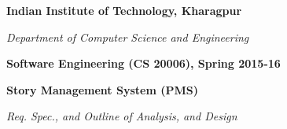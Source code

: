 \documentclass{article}
\begin{document}
\thispagestyle{plain}
\setcounter{page}{1}

\begin{center}
{\huge {\bf Indian Institute of Technology, Kharagpur}} 

{\LARGE {\em Department of Computer Science and Engineering}}
\vspace{0.4cm}

{\Large \bf Software Engineering (CS 20006), Spring 2015-16} \vspace{0.1cm}

{\large \bf Story Management System (PMS)} \vspace{0.1cm}

{\large \em Req. Spec., and Outline of Analysis, and Design} %
\end{center}

\hspace{-1cm}

\begin{tabular}{l}
\hspace{16cm} \\ \hline 
\end{tabular}
\end{document}
